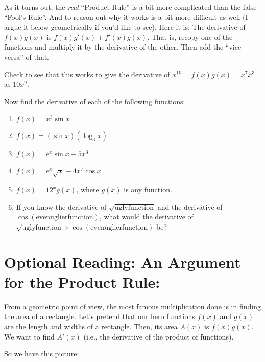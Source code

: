 \documentclass{ximera}
\begin{document}
     As it turns out, the {\em real} ``Product Rule'' is a bit more complicated than the false ``Fool's Rule''.  And to reason out why it works is a bit more difficult as well (I argue it below geometrically if you'd like to see).  Here it is:  The derivative of $f(x) g(x)$ is  $f(x)g'(x) + f'(x) g(x)$.  That is, recopy one of the functions and multiply it by the derivative of the other.  Then add the ``vice versa'' of that.
     
    Check to see that this works to give the derivative of $x^{10} = f(x)g(x) = x^7x^3$ as  $10x^9$.

\begin{question}
Now find the derivative of each of the following functions:
\begin{enumerate}
    \item $f(x) = x^3\sin x$
    \item $f(x) = (\sin x)(\log_6 x)$
    \item $f(x) = e^x \sin x - 5x^3$
    \item $f(x) = e^x\sqrt{x} - 4x^7\cos x$
    \item $f(x) = 12^xg(x)$, where $g(x)$ is any function.
    \item If you know the derivative of $\sqrt{\text{uglyfunction}}$ and the derivative of  $\cos(\text{evenuglierfunction})$, what would the derivative of  $\sqrt{\text{uglyfunction}}\times \cos(\text{evenuglierfunction})$  be?
\end{enumerate}
\end{question}

\section*{Optional Reading: An Argument for the Product Rule:}

   From a geometric point of view, the most famous multiplication done is in finding the area of a rectangle.  Let’s pretend that our hero functions $f(x)$ and $g(x)$ are the length and widths of a rectangle.  Then, its area $A(x)$ is $f(x)g(x)$.  We want to find $A'(x)$ (i.e., the derivative of the product of functions).  
   
    So we have this picture:
    \begin{center}
    \end{center}
 
\end{document}
